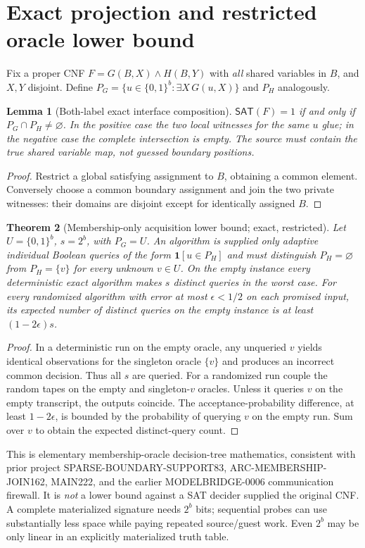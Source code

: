 \documentclass[11pt]{article}
\newtheorem{theorem}{Theorem}
\newtheorem{lemma}[theorem]{Lemma}
\newcommand{\SAT}{\mathsf{SAT}}
\begin{document}
\section{Exact projection and restricted oracle lower bound}
Fix a proper CNF $F=G(B,X)\wedge H(B,Y)$ with \emph{all} shared variables in $B$, and $X,Y$ disjoint. Define $P_G=\{u\in\{0,1\}^b:\exists X\,G(u,X)\}$ and $P_H$ analogously.
\begin{lemma}[Both-label exact interface composition]
$\SAT(F)=1$ if and only if $P_G\cap P_H\ne\varnothing$. In the positive case the two local witnesses for the same $u$ glue; in the negative case the complete intersection is empty. The source must contain the true shared variable map, not guessed boundary positions.
\end{lemma}
\begin{proof} Restrict a global satisfying assignment to $B$, obtaining a common element. Conversely choose a common boundary assignment and join the two private witnesses: their domains are disjoint except for identically assigned $B$. \end{proof}

\begin{theorem}[Membership-only acquisition lower bound; exact, restricted]
Let $U=\{0,1\}^b$, $s=2^b$, with $P_G=U$. An algorithm is supplied \emph{only} adaptive individual Boolean queries of the form $\mathbf1[u\in P_H]$ and must distinguish $P_H=\varnothing$ from $P_H=\{v\}$ for every unknown $v\in U$. On the empty instance every deterministic exact algorithm makes $s$ distinct queries in the worst case. For every randomized algorithm with error at most $\epsilon<1/2$ on \emph{each} promised input, its expected number of distinct queries on the empty instance is at least $(1-2\epsilon)s$.
\end{theorem}
\begin{proof} In a deterministic run on the empty oracle, any unqueried $v$ yields identical observations for the singleton oracle $\{v\}$ and produces an incorrect common decision. Thus all $s$ are queried. For a randomized run couple the random tapes on the empty and singleton-$v$ oracles. Unless it queries $v$ on the empty transcript, the outputs coincide. The acceptance-probability difference, at least $1-2\epsilon$, is bounded by the probability of querying $v$ on the empty run. Sum over $v$ to obtain the expected distinct-query count. \end{proof}

This is elementary membership-oracle decision-tree mathematics, consistent with prior project SPARSE-BOUNDARY-SUPPORT83, ARC-MEMBERSHIP-JOIN162, MAIN222, and the earlier MODELBRIDGE-0006 communication firewall. It is \emph{not} a lower bound against a SAT decider supplied the original CNF. A complete materialized signature needs $2^b$ bits; sequential probes can use substantially less space while paying repeated source/guest work. Even $2^b$ may be only linear in an explicitly materialized truth table.
\end{document}
